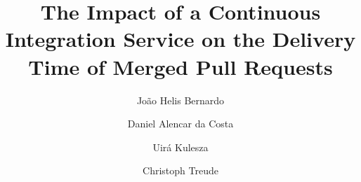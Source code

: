 
\newcommand{\ct}[1] {\textcolor{purple}{[\textbf{Christoph}: #1]} }
\newcommand{\dac}[1] {\textcolor{blue}{[\textbf{Dan}: #1]} }
\newcommand{\jh}[1] {\textcolor{red}{[\textbf{Jo\~{a}o}: #1]} }

\newcommand{\RQone}{RQ1: Are merged pull requests released more quickly using a CI service?}
\newcommand{\RQtwo}{RQ2: Does the increased number of PR submissions after adopting a CI service increase the delivery time of pull requests?}
\newcommand{\RQthree}{RQ3: What factors impact the delivery time after adopting a CI service?}
\newcommand{\RQfive}{RQ4: What is the perceived influence of CI on the time to deliver merged PRs?}
\newcommand{\RQfour}{RQ5: What are the perceived causes of delay in the delivery time of merged PRs?}
\newcommand{\RQsix}{RQ6: What is the perceived influence of CI on the software release process?}
\newcommand{\RQseven}{RQ7: What is the perceived influence of CI on the code review process?}
\newcommand{\RQeight}{RQ8: What is the perceived influence of CI on attracting more contributors to open-source projects?}

%
%
%
%


	
	\title{
	The Impact of a Continuous Integration Service on the Delivery Time of Merged Pull Requests
	}
	
	
	\author{Jo{\~a}o Helis Bernardo         \and
		Daniel Alencar da Costa \and 
		Uir{\'a} Kulesza \and 
		Christoph Treude %
	}
	
	

